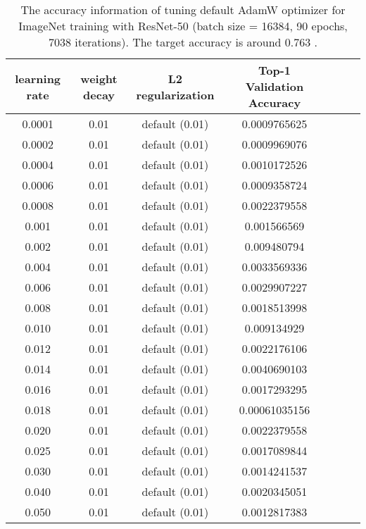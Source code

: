 \documentclass{article} \usepackage{iclr2020_conference,times}
\begin{document}
\begin{table}[ht]
\renewcommand{\arraystretch}{1.3}
\caption{The accuracy information of tuning default AdamW optimizer for ImageNet training with ResNet-50 (batch size = 16384, 90 epochs, 7038 iterations). The target accuracy is around 0.763 \citep{goyal2017accurate}.}
\centering
\begin{tabular}{|c|c|c|c|c|c|c|}
\hline
learning rate & weight decay & L2 regularization & Top-1 Validation Accuracy\\
\hline
\hline
0.0001 & 0.01 & default (0.01) & 0.0009765625 \\
\hline
0.0002 & 0.01 & default (0.01) & 0.0009969076 \\
\hline
0.0004 & 0.01 & default (0.01) & 0.0010172526 \\
\hline
0.0006 & 0.01 & default (0.01) & 0.0009358724 \\
\hline
0.0008 & 0.01 & default (0.01) & 0.0022379558 \\
\hline
0.001 & 0.01 & default (0.01) & 0.001566569 \\
\hline
0.002 & 0.01 & default (0.01) & 0.009480794 \\
\hline
0.004 & 0.01 & default (0.01) & 0.0033569336 \\
\hline
0.006 & 0.01 & default (0.01) & 0.0029907227 \\
\hline
0.008 & 0.01 & default (0.01) & 0.0018513998 \\
\hline
0.010 & 0.01 & default (0.01) & 0.009134929 \\
\hline
0.012 & 0.01 & default (0.01) & 0.0022176106 \\
\hline
0.014 & 0.01 & default (0.01) & 0.0040690103 \\
\hline
0.016 & 0.01 & default (0.01) & 0.0017293295 \\
\hline
0.018 & 0.01 & default (0.01) & 0.00061035156 \\
\hline
0.020 & 0.01 & default (0.01) & 0.0022379558 \\
\hline
0.025 & 0.01 & default (0.01) & 0.0017089844 \\
\hline
0.030 & 0.01 & default (0.01) & 0.0014241537 \\
\hline
0.040 & 0.01 & default (0.01) & 0.0020345051 \\
\hline
0.050 & 0.01 & default (0.01) & 0.0012817383 \\
\hline
\end{tabular}
\label{table:imagenet_adamw_default_l2_4}
\end{table}
\end{document}
